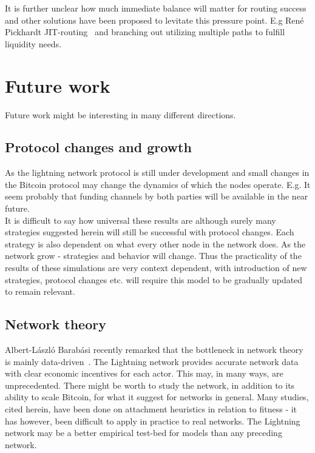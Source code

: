 It is further unclear how much immediate balance will matter for routing success and other solutions have been proposed to levitate this pressure point. E.g René Pickhardt JIT-routing~\cite{pickard:jit} and branching out utilizing multiple paths to fulfill liquidity needs.   

\section{Future work}

Future work might be interesting in many different directions.

\subsection{Protocol changes and growth}

As the lightning network protocol is still under development and small changes in the Bitcoin protocol may change the dynamics of which the nodes operate. E.g. It seem probably that funding channels by both parties will be available in the near future. \\

It is difficult to say how universal these results are although surely many strategies suggested herein will still be successful with protocol changes. Each strategy is also dependent on what every other node in the network does. As the network grow - strategies and behavior will change. Thus the practicality of the results of these simulations are very context dependent, with introduction of new strategies, protocol changes etc. will require this model to be gradually updated to remain relevant.  

\subsection{Network theory}

Albert-László Barabási recently remarked that the bottleneck in network theory is mainly data-driven~\cite{barabasi:decade:beyond}. The Lightning network provides accurate network data with clear economic incentives for each actor. This may, in many ways, are unprecedented. There might be worth to study the network, in addition to its ability to scale Bitcoin, for what it suggest for networks in general. Many studies, cited herein, have been done on attachment heuristics in relation to fitness - it has however, been difficult to apply in practice to real networks. The Lightning network may be a better empirical test-bed for models than any preceding network. 

